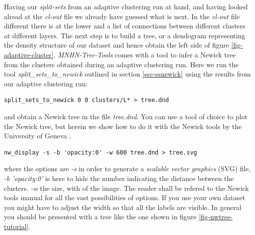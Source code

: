 Having our \emph{split-sets} from an adaptive clustering run at hand,
and having looked alread at the \emph{cl-out} file we already have
guessed what is next. In the \emph{cl-out} file different there is at
the lower and a list of connections between different clusters at
different layers. The next step is to build a tree, or a dendogram
representing the density structure of our dataset and hence obtain the
left side of figure \ref{fig-adaptive-cluster}. \emph{MNHN-Tree-Tools} comes
with a tool to infer a Newick tree \cite{newick} from the clusters
obtained during an adaptive clustering run. Here we run the tool
\emph{split\_sets\_to\_newick} outlined in section \ref{sec-ssnewick}
using the results from our adaptive clustering run:
\begin{lstlisting}
split_sets_to_newick 0 0 clusters/L* > tree.dnd
\end{lstlisting}
and obtain a Newick tree in the file \emph{tree.dnd}. You can use a
tool of choice to plot the Newick tree, but herein we show how to do
it with the Newick tools by the University of Geneva
\cite{newick_tools}.
\begin{lstlisting}
nw_display -s -b 'opacity:0' -w 600 tree.dnd > tree.svg
\end{lstlisting}
where the options are \emph{-s} in order to generate a \emph{scalable
vector graphics} (SVG) file, \emph{-b 'opacity:0'} is here to hide the
number indicating the distance between the clusters. \emph{-w} the
size, with of the image. The reader shall be refered to the Newick
tools manual for all the vast possibilities of options. If you use
your own dataset you might have to adjust the width so that all the
labels are visible. In general you should be presented with a tree
like the one shown in figure \ref{fig-nwtree-tutorial}.
